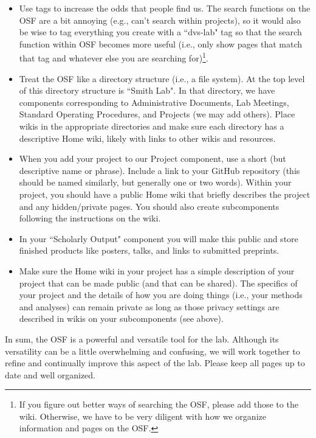 \documentclass[letterpaper,12pt,oneside]{memoir}
\begin{document}
\begin{itemize}

\item Use tags to increase the odds that people find us. The search functions on the OSF are a bit annoying (e.g., can't search within projects), so it would also be wise to tag everything you create with a ``dvs-lab" tag so that the search function within OSF becomes more useful (i.e., only show pages that match that tag and whatever else you are searching for)\footnote{If you figure out better ways of searching the OSF, please add those to the wiki. Otherwise, we have to be very diligent with how we organize information and pages on the OSF.}.

\item Treat the OSF like a directory structure (i.e., a file system). At the top level of this directory structure is ``Smith Lab". In that directory, we have components corresponding to Administrative Documents, Lab Meetings, Standard Operating Procedures, and Projects (we may add others). Place wikis in the appropriate directories and make sure each directory has a descriptive Home wiki, likely with links to other wikis and resources.

\item When you add your project to our Project component, use a short (but descriptive name or phrase). Include a link to your GitHub repository (this should be named similarly, but generally one or two words). Within your project, you should have a public Home wiki that briefly describes the project and any hidden/private pages. You should also create subcomponents following the instructions on the wiki.

\item In your ``Scholarly Output" component you will make this public and store finished products like posters, talks, and links to submitted preprints. 

\item Make sure the Home wiki in your project has a simple description of your project that can be made public (and that can be shared). The specifics of your project and the details of how you are doing things (i.e., your methods and analyses) can remain private as long as those privacy settings are described in wikis on your subcomponents (see above). 

\end{itemize}

\begin{shaded}
\noindent In sum, the OSF is a powerful and versatile tool for the lab. Although its versatility can be a little overwhelming and confusing, we will work together to refine and continually improve this aspect of the lab. Please keep all pages up to date and well organized. 
\end{shaded}
\end{document}
